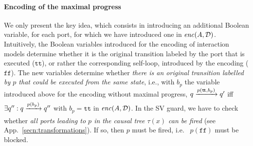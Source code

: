 \documentclass{llncs}
\newcommand{\todoSB}[2][color=green!40, size=\tiny]{\todo[#1]{\textbf{To-do Simon:} {#2}}}
\newcommand{\tab}[1]{Tab.~\ref{tab:#1}}
\newcommand{\eq}[1]{(\ref{eq:#1})}
\newcommand{\app}[1]{App.~\ref{secn:#1}}
\newcommand{\cD}{\ensuremath{\mathcal{D}}}
\newcommand{\ie}[1][\ ]{i.e.#1}
\newcommand{\goesto}[2][]{\ensuremath{\xrightarrow[{#1}\relax]{#2}}}
\newcommand{\true} {\ensuremath{\mathtt{t\!t}}}
\newcommand{\false}{\ensuremath{\mathtt{f\!f}}}
\newcommand{\trigsynch}{%
  \mbox{\ensuremath{\blacktriangleright\!\!\!-\!\!\!-\!\!\!\bullet}}}
\newcommand{\nopri}[1][]{\ensuremath{\mathit{enc}%
    \ifx#1\relax\else(#1)\fi}}
\newcommand{\partition}{\cD}
\begin{document}


\paragraph{Encoding of the maximal progress}
We only present the key idea, which consists in
introducing an additional Boolean variable, for each port, for which we
have introduced one in $\nopri[A, \partition]$.  Intuitively, 
the Boolean
variables introduced for the encoding of interaction models
determine whether it is the original transition
labeled by the port that is executed (\true), or rather the corresponding
self-loop, introduced by the encoding (\false).  The new variables
determine whether \emph{there is an original transition labelled by
  $p$ that could be executed from the same state}, \ie[,] with $b_p$
the variable introduced above for the encoding without maximal
progress, $q \goesto{p(\true, b_p)} q'$ iff $\exists q'': q
\goesto{p(b_p)} q''$ with $b_p = \true$ in $\nopri[A, \partition]$.
In the SV guard, we have to check whether \emph{all ports
  leading to $p$ in the causal tree $\tau(x)$ can be fired} (see
\app{transformations}).  If so, then $p$ must be fired, \ie
$p(\false)$ must be blocked.
\end{document}
